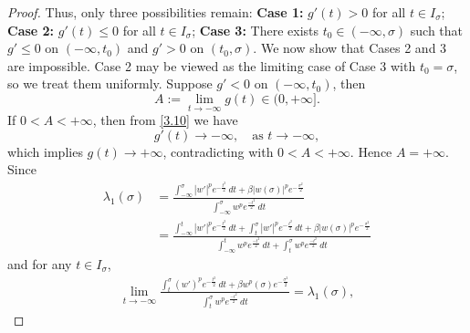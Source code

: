 \documentclass[10pt,a4paper]{amsart}
\begin{document}
\begin{proof}
 Thus, only three  possibilities remain:
 {\bf Case 1:} $g'(t)>0$ for all $t\in I_\sigma$;
   {\bf Case 2:} $g'(t)\le 0$ for all $t\in I_\sigma$;
   {\bf Case 3:} There exists $t_0\in (-\infty, \sigma)$ such that
 $g'\le 0$ on $(-\infty, t_0)$ and $g'>0$ on $(t_0, \sigma)$. 
We now show that Cases 2 and 3 are impossible. Case 2 may be viewed as the limiting case of Case 3 with $t_0=\sigma$, so we treat them uniformly. Suppose $g'<0$ on $(-\infty, t_0)$, then 
$$
A:=\lim_{t\rightarrow -\infty}g(t)\in (0, +\infty].
$$
If $0<A<+\infty$,  then from \eqref{3.10} we have
$$
g'(t)\to -\infty, \quad \text{as $t \to -\infty$},
$$
which implies $g(t)\to +\infty$, contradicting with $0<A<+\infty$.
Hence $A=+\infty$.  Since
\begin{align*}
    \lambda_1(\sigma)& = \frac{\int_{-\infty}^{\sigma} |w'|^p e^{-\frac{t^2}{2}} \, dt + \beta |w(\sigma)|^pe^{-\frac{\sigma^2}{2}}}{\int_{-\infty}^{\sigma} w^p e^{\frac{-t^2}{2}} \, dt}\\
&= \frac{\int_{-\infty}^{t} |w'|^p e^{-\frac{t^2}{2}} \, dt + \int_{t}^{\sigma} |w'|^p e^{-\frac{t^2}{2}} \, dt + \beta |w(\sigma)|^p e^{-\frac{\sigma^2}{2}} }{\int_{-\infty}^{t} w^p e^{\frac{-t^2}{2}}\, dt + \int_{t}^{\sigma} w^p e^{\frac{-t^2}{2}}\, dt}
\end{align*}
 and for any $t\in I_\sigma$,
\begin{align*}
    \lim_{t\rightarrow-\infty}\frac{ \int_{t}^{\sigma} (w')^p e^{-\frac{t^2}{2}} \, dt + \beta w^p(\sigma) e^{-\frac{\sigma^2}{2}} }{\int_{t}^{\sigma} w^p e^{\frac{-t^2}{2}}\, dt}=\lambda_1(\sigma),
\end{align*}

\end{proof}
\end{document}

